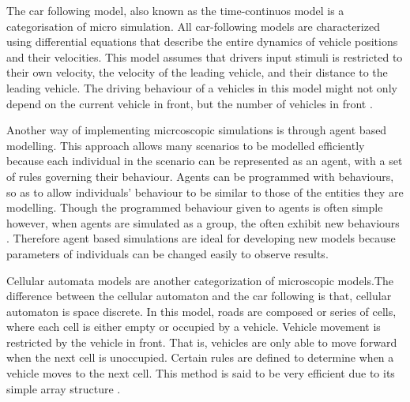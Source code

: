 \par{}
The car following model, also known as the time-continuos model is a categorisation of micro simulation. All car-following models are characterized using differential equations that  describe the entire dynamics of vehicle positions and their velocities. This model assumes that drivers input stimuli is restricted to their own velocity, the velocity of the leading vehicle, and their distance to the leading vehicle. The driving behaviour of a vehicles in this model might not only depend on the current vehicle in front, but the number of vehicles in front \cite{macrosim}.

\par{}
Another way of implementing micrcoscopic simulations is through agent based modelling. This approach allows many scenarios to be modelled efficiently because each individual in the scenario can be represented as an agent, with a set of rules governing their behaviour. Agents can be programmed with behaviours, so as to allow individuals' behaviour to be similar to those of the entities they are modelling. Though the programmed behaviour given to agents is often simple however, when agents are simulated as a group, the often exhibit new behaviours \cite{2}.
Therefore agent based simulations are ideal for developing new models  because parameters of individuals can be changed easily to observe results.

\par{}
Cellular automata models are another categorization of microscopic models.The difference between the cellular automaton and the car following is that, cellular automaton is space discrete. In this model, roads are composed or series of cells, where each cell is either empty or occupied by a vehicle. Vehicle movement is restricted by the vehicle in front. That is, vehicles are only able to move forward when the next cell is unoccupied. Certain rules are defined  to determine when a vehicle moves to the next cell. This method is said to be very efficient due to its simple array structure \cite{Ali}.

